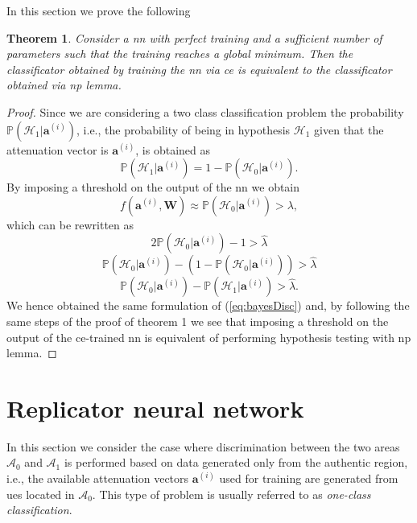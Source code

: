 \documentclass[draftcls,onecolumn,12pt]{IEEEtran}
\newtheorem{theorem}{Theorem}
\begin{document}
In this section we prove the following
\begin{theorem}
\label{th:nn_np2}
Consider a \ac{nn} with perfect training and a sufficient number of parameters such that the training reaches a global minimum. Then the classificator obtained by training the \ac{nn} via \ac{ce} is equivalent to the classificator obtained via \ac{np} lemma.
\end{theorem}
\begin{proof}
Since we are considering a two class classification problem the probability $\mathbb{P}(\mathcal{H}_1|\bm{a}^{(i)})$, i.e., the probability of being in hypothesis $\mathcal{H}_1$ given that the attenuation vector is $\bm{a}^{(i)}$, is obtained as
\begin{equation}
    \mathbb{P}(\mathcal{H}_1|\bm{a}^{(i)}) = 1- \mathbb{P}(\mathcal{H}_0|\bm{a}^{(i)}).
\end{equation}
By imposing a threshold on the output of the \ac{nn} we obtain
\begin{equation}
    f(\bm{a}^{(i)},\bm{W}) \approx \mathbb{P}(\mathcal{H}_0|\bm{a}^{(i)}) > \lambda,
\end{equation}
which can be rewritten as
\begin{equation}
    2\mathbb{P}(\mathcal{H}_0|\bm{a}^{(i)})-1 > \hat{\lambda}
\end{equation}
\begin{equation}
    \mathbb{P}(\mathcal{H}_0|\bm{a}^{(i)})-(1-\mathbb{P}(\mathcal{H}_0|\bm{a}^{(i)})) > \hat{\lambda}
\end{equation}
\begin{equation}
    \mathbb{P}(\mathcal{H}_0|\bm{a}^{(i)})-\mathbb{P}(\mathcal{H}_1|\bm{a}^{(i)}) > \hat{\lambda}.
\end{equation}
We hence obtained the same formulation of (\ref{eq:bayesDisc}) and, by following the same steps of the proof of theorem 1 we see that imposing a threshold on the output of the \ac{ce}-trained \ac{nn} is equivalent of performing hypothesis testing with \ac{np} lemma.
\end{proof}

\section{Replicator neural network}\label{sec:auto}
In this section we consider the case where discrimination between the two areas $\mathcal{A}_0$ and $\mathcal{A}_1$ is performed based on data generated only from the authentic region, i.e., the available attenuation vectors $\bm{a}^{(i)}$ used for training are generated from \acp{ue} located in $\mathcal{A}_0$. This type of problem is usually referred to as \textit{one-class classification}. 
\end{document}
